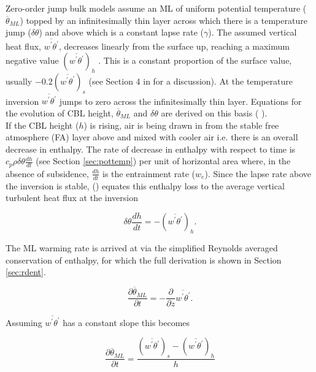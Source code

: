 Zero-order jump bulk models assume an \acs{ML} of uniform potential temperature ($\overline{\theta}_{ML}$) topped by an infinitesimally thin layer across which there is a temperature jump ($\delta \theta$) and above which is a constant lapse rate ($\gamma$).  The assumed vertical heat flux, $\overline{w^{'}\theta^{'}}$, decreases linearly from the surface up, reaching a maximum negative value $(\overline{w^{'}\theta^{'}})_{h}$ .  This is a constant proportion of the surface value, usually $-0.2(\overline{w^{'}\theta^{'}})_{s}$ (see Section 4 in \citeauthor{Tennekes73} \citeyear{Tennekes73} for a discussion). At the temperature inversion $\overline{w^{'}\theta^{'}}$ jumps to zero across the infinitesimally thin layer.  Equations for the evolution of \acs{CBL} height, $\overline{\theta}_{ML}$ and $\delta \theta$ are derived on this basis (\citeauthor{Tennekes73} \citeyear{Tennekes73}).\\

If the \acs{CBL} height ($h$) is rising, air is being drawn in from the stable free atmosphere (FA) layer above and mixed with cooler air i.e. there is an overall decrease in enthalpy.  The rate of decrease in enthalpy with respect to time is $c_{p}\rho \delta \theta \frac{dh}{dt}$ (see Section \ref{sec:pottemp}) per unit of horizontal area where, in the absence of subsidence, $\frac{dh}{dt}$ is the entrainment rate ($w_{e}$).  Since the lapse rate above the inversion is stable, \citeauthor{Tennekes73} (\citeyear{Tennekes73}) equates this enthalpy loss to the average vertical turbulent heat flux at the inversion

\begin{equation}
\delta \theta \frac{dh}{dt} = -(\overline{w^{'}\theta^{'}})_{h}. 
\end{equation}  

The \acs{ML} warming rate is arrived at via the simplified Reynolds averaged conservation of enthalpy, for which the full derivation is shown in Section \ref{sec:rdent}.

\begin{equation}
\label{eq:warming}
\frac{\partial \overline{\theta}_{ML}}{\partial t} = -\frac{\partial}{\partial z}\overline{w^{'}\theta^{'}}.
\end{equation}

Assuming $\overline{w^{'}\theta^{'}}$ has a constant slope this becomes

\begin{equation}
\frac{\partial \overline{\theta}_{ML}}{\partial t} = \frac{(\overline{w^{'}\theta^{'}})_{s}-(\overline{w^{'}\theta^{'}})_{h}}{h}
\end{equation}

